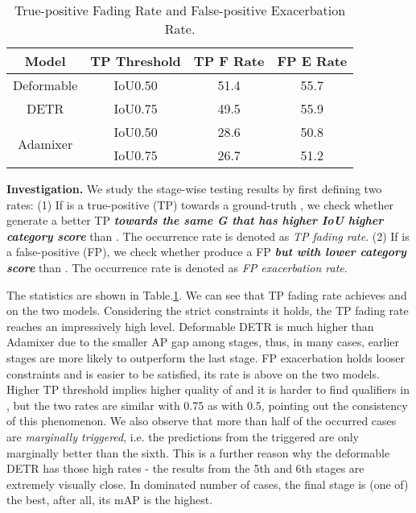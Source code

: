 \documentclass[10pt,twocolumn,letterpaper]{article}
\begin{document}
\begin{table}[]
    \centering
    \begin{tabular}{c|c|c|c}
        \toprule[1pt]
        Model       & TP Threshold & TP F Rate & FP E Rate \\ 
        \midrule
        Deformable & IoU0.50 & 51.4 & 55.7 \\ 
        DETR & IoU0.75 & 49.5 & 55.9 \\ \midrule
        \multirow{2}{*}{Adamixer} & IoU0.50 & 28.6 & 50.8 \\
         & IoU0.75 & 26.7 & 51.2  \\
        \bottomrule
    \end{tabular}
    \caption{True-positive Fading Rate and False-positive Exacerbation Rate. }
    \label{tab:fade_grace}
\end{table}


\textbf{Investigation.} We study the stage-wise testing results by first defining two rates: (1) If  is a true-positive (TP) towards a ground-truth , we check whether  generate a better TP \textit{\textbf{towards the same G that has higher IoU  higher category score}} than . The occurrence rate is denoted as \textit{TP fading rate}. (2) If  is a false-positive (FP), we check whether  produce a FP \textit{\textbf{but with lower category score}} than . The occurrence rate is denoted as \textit{FP exacerbation rate}. 


The statistics are shown in Table.\ref{tab:fade_grace}. We can see that TP fading rate achieves  and  on the two models. Considering the strict constraints it holds, the TP fading rate reaches an impressively high level. Deformable DETR is much higher than Adamixer due to the smaller AP gap among stages, thus, in many cases, earlier stages are more likely to outperform the last stage. FP exacerbation holds looser constraints and is easier to be satisfied, its rate is above  on the two models. Higher TP threshold implies higher quality of  and it is harder to find qualifiers in , but the two rates are similar with 0.75 as with 0.5, pointing out the consistency of this phenomenon. We also observe that more than half of the occurred cases are \textit{marginally triggered}, i.e. the predictions from the triggered  are only marginally better than the sixth. This is a further reason why the deformable DETR has those high rates - the results from the 5th and 6th stages are extremely visually close. In dominated number of cases, the final stage is (one of) the best, after all, its mAP is the highest. 
\end{document}
